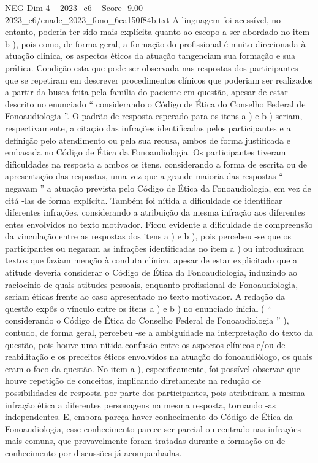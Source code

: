 \begin{textsample}{NEG Dim 4 – 2023\_c6 – Score -9.00 – 2023\_c6/enade\_2023\_fono\_6ca150f84b.txt}
A linguagem foi acessível, no entanto, poderia ter sido mais explícita quanto ao escopo a ser abordado no item b ), pois como, de forma geral, a formação do profissional é muito direcionada à atuação clínica, os aspectos éticos da atuação tangenciam sua formação e sua prática.
Condição esta que pode ser observada nas respostas dos participantes que se repetiram em descrever procedimentos clínicos que poderiam ser realizados a partir da busca feita pela família do paciente em questão, apesar de estar descrito no enunciado “ considerando o Código de Ética do Conselho Federal de Fonoaudiologia ”.
O padrão de resposta esperado para os itens a ) e b ) seriam, respectivamente, a citação das infrações identificadas pelos participantes e a definição pelo atendimento ou pela sua recusa, ambos de forma justificada e embasada no Código de Ética da Fonoaudiologia.
Os participantes tiveram dificuldades na resposta a ambos os itens, considerando a forma de escrita ou de apresentação das respostas, uma vez que a grande maioria das respostas “ negavam ” a atuação prevista pelo Código de Ética da Fonoaudiologia, em vez de citá -las de forma explícita.
Também foi nítida a dificuldade de identificar diferentes infrações, considerando a atribuição da mesma infração aos diferentes entes envolvidos no texto motivador.
Ficou evidente a dificuldade de compreensão da vinculação entre as respostas dos itens a ) e b ), pois percebeu -se que os participantes ou negaram as infrações identificadas no item a ) ou introduziram textos que faziam menção à conduta clínica, apesar de estar explicitado que a atitude deveria considerar o Código de Ética da Fonoaudiologia, induzindo ao raciocínio de quais atitudes pessoais, enquanto profissional de Fonoaudiologia, seriam éticas frente ao caso apresentado no texto motivador.
A redação da questão expôs o vínculo entre os itens a ) e b ) no enunciado inicial ( “ considerando o Código de Ética do Conselho Federal de Fonoaudiologia ” ), contudo, de forma geral, percebeu -se a ambiguidade na interpretação do texto da questão, pois houve uma nítida confusão entre os aspectos clínicos e/ou de reabilitação e os preceitos éticos envolvidos na atuação do fonoaudiólogo, os quais eram o foco da questão.
No item a ), especificamente, foi possível observar que houve repetição de conceitos, implicando diretamente na redução de possibilidades de resposta por parte dos participantes, pois atribuíram a mesma infração ética a diferentes personagens na mesma resposta, tornando -as independentes.
E, embora pareça haver conhecimento do Código de Ética da Fonoaudiologia, esse conhecimento parece ser parcial ou centrado nas infrações mais comuns, que provavelmente foram tratadas durante a formação ou de conhecimento por discussões já acompanhadas.

\end{textsample}
